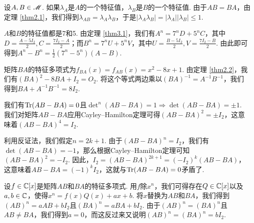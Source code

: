 \setcounter{solution}{15}

\begin{solution}
  设$A,B\in\mathscr M$. 如果$\lambda_A$是$A$的一个特征值，$\lambda_B$是$B$的一个特征值. 由于$AB=BA$，由定理 \ref{thm2.1}，我们得到$\lambda_{AB}=\lambda_A\lambda_B$，于是$|\lambda_A\lambda_B|=|\lambda_A||\lambda_B|\le1$.
\end{solution}

\begin{solution}
  $A$和$B$的特征值都是7和5. 由定理 \ref{thm3.1}，我们有$A^n=7^nD+5^nC$，其中$D=\frac{A-5I_2}2,C=\frac{7I_2-A}2$；而$B^n=7^nU+5^nV$，其中$U=\frac{B-5I_2}2,V=\frac{7I_2-B}2$. 由此即可得到$A^n-B^n=\frac12(7^n-5^n)(A-B)$.
\end{solution}

\begin{solution}
  矩阵$BA$的特征多项式为$f_{BA}(x)=f_{AB}(x)=x^2-8x+1$. 由定理 \ref{thm2.2}，我们有$(BA)^2-8BA+I_2=O_2$. 将这个等式两边乘以$(BA)^{-1}=A^{-1}B^{-1}$，我们得到$BA+A^{-1}B^{-1}=8I_2$.
\end{solution}

\setcounter{solution}{19}

\begin{solution}
  我们有$\operatorname{Tr}(AB-BA)=0$且$\det\nolimits^n(AB-BA)=1\Rightarrow
  \det(AB-BA)=\pm1$. 我们对矩阵$AB-BA$应用Cayley--Hamilton定理可得$(AB-BA)^2=\pm I_2$，这意味着$(AB-BA)^4=I_2$.

  利用反证法，我们假定$n=2k+1$. 由于$(AB-BA)^n=I_2$，我们有$\det(AB-BA)=-1$，那么根据Cayley--Hamilton定理可知$(AB-BA)^2=-I_2$. 因此，$I_2=(AB-BA)^{2k+1}=(-I_2)^k(AB-BA)$，这意味着$AB-BA=(-1)^kI_2$，这就与$\operatorname{Tr}(AB-BA)=0$矛盾了.
\end{solution}


\begin{solution}
  设$f\in\mathbb C[x]$是矩阵$AB$和$BA$的特征多项式. 用$f$除$x^n$，我们可得存在$Q\in\mathbb C[x]$以及$a,b\in\mathbb C$，使得$x^n=f(x)Q(x)+ax+b$. 将$x$替换为$AB$和$BA$，我们得到$(AB)^n=aAB+bI_2$且$(BA)^n=aBA+bI_2$. 由于$(AB)^n=(BA)^n$且$AB\ne BA$，我们得到$a=0$，而这反过来又说明$(AB)^n=(BA)^n=bI_2$.
\end{solution}

